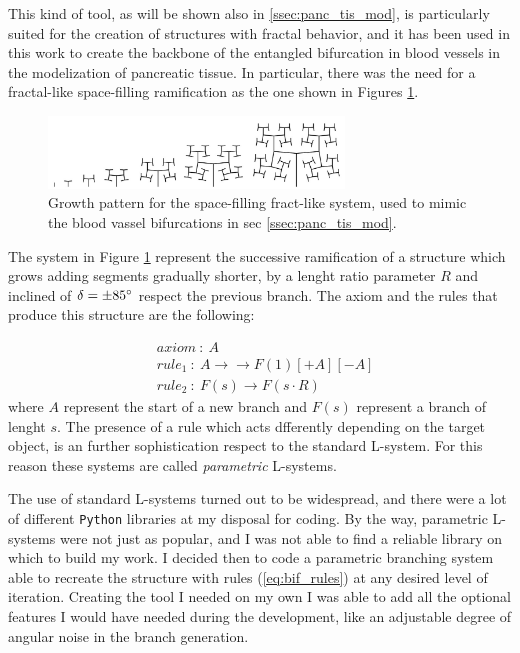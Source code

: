 This kind of tool, as will be shown also in \ref{ssec:panc_tis_mod}, is particularly suited for the creation of structures with fractal behavior, and it has been used in this work to create the backbone of the entangled bifurcation in blood vessels in the modelization of pancreatic tissue. In particular, there was the need for a fractal-like space-filling ramification as the one shown in Figures \ref{fig:bf_ls}. %

\begin{figure}
    \centering
    \includegraphics[width = 0.7\textwidth]{images/bf_ls}
    \caption{Growth pattern for the space-filling fract-like system, used to mimic the blood vassel bifurcations in sec \ref{ssec:panc_tis_mod}.}
    \label{fig:bf_ls}
\end{figure}


The system in Figure \ref{fig:bf_ls} represent the successive ramification of a structure which grows adding segments gradually shorter, by a lenght ratio parameter $R$ and inclined of $\delta = \pm 85 \degree$ respect the previous branch. The axiom and the rules that produce this structure are the following:

\begin{align}
    & axiom\ :\ A \label{eq:bif_rules} \\
    & rule_1\ :\ A \rightarrow → F(1)[+A][-A] \nonumber \\
    & rule_2\ :\ F(s) \rightarrow F(s\cdot R) \nonumber
\end{align}
where $A$ represent the start of a new branch  and $F(s)$ represent a branch of lenght $s$. The presence of a rule which acts dfferently depending on the target object, is an further sophistication respect to the standard L-system. For this reason these systems are called \textit{parametric} L-systems.

The use of standard L-systems turned out to be widespread, and there were a lot of different \texttt{Python} libraries at my disposal for coding. By the way, parametric L-systems were not just as popular, and I was not able to find a reliable library on which to build my work. I decided then to code a parametric branching system able to recreate the structure with rules (\ref{eq:bif_rules}) at any desired level of iteration. Creating the tool I needed on my own I was able to add all the optional features I would have needed during the development, like an adjustable degree of angular noise in the branch generation.

